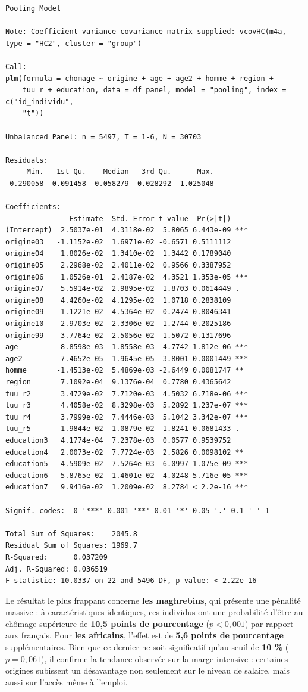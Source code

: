\documentclass[
  letterpaper,
  DIV=11,
  numbers=noendperiod]{scrartcl}
\begin{document}
\begin{verbatim}
Pooling Model

Note: Coefficient variance-covariance matrix supplied: vcovHC(m4a, type = "HC2", cluster = "group")

Call:
plm(formula = chomage ~ origine + age + age2 + homme + region + 
    tuu_r + education, data = df_panel, model = "pooling", index = c("id_individu", 
    "t"))

Unbalanced Panel: n = 5497, T = 1-6, N = 30703

Residuals:
     Min.   1st Qu.    Median   3rd Qu.      Max. 
-0.290058 -0.091458 -0.058279 -0.028292  1.025048 

Coefficients:
               Estimate  Std. Error t-value  Pr(>|t|)    
(Intercept)  2.5037e-01  4.3118e-02  5.8065 6.443e-09 ***
origine03   -1.1152e-02  1.6971e-02 -0.6571 0.5111112    
origine04    1.8026e-02  1.3410e-02  1.3442 0.1789040    
origine05    2.2968e-02  2.4011e-02  0.9566 0.3387952    
origine06    1.0526e-01  2.4187e-02  4.3521 1.353e-05 ***
origine07    5.5914e-02  2.9895e-02  1.8703 0.0614449 .  
origine08    4.4260e-02  4.1295e-02  1.0718 0.2838109    
origine09   -1.1221e-02  4.5364e-02 -0.2474 0.8046341    
origine10   -2.9703e-02  2.3306e-02 -1.2744 0.2025186    
origine99    3.7764e-02  2.5056e-02  1.5072 0.1317696    
age         -8.8598e-03  1.8558e-03 -4.7742 1.812e-06 ***
age2         7.4652e-05  1.9645e-05  3.8001 0.0001449 ***
homme       -1.4513e-02  5.4869e-03 -2.6449 0.0081747 ** 
region       7.1092e-04  9.1376e-04  0.7780 0.4365642    
tuu_r2       3.4729e-02  7.7120e-03  4.5032 6.718e-06 ***
tuu_r3       4.4058e-02  8.3298e-03  5.2892 1.237e-07 ***
tuu_r4       3.7999e-02  7.4446e-03  5.1042 3.342e-07 ***
tuu_r5       1.9844e-02  1.0879e-02  1.8241 0.0681433 .  
education3   4.1774e-04  7.2378e-03  0.0577 0.9539752    
education4   2.0073e-02  7.7724e-03  2.5826 0.0098102 ** 
education5   4.5909e-02  7.5264e-03  6.0997 1.075e-09 ***
education6   5.8765e-02  1.4601e-02  4.0248 5.716e-05 ***
education7   9.9416e-02  1.2009e-02  8.2784 < 2.2e-16 ***
---
Signif. codes:  0 '***' 0.001 '**' 0.01 '*' 0.05 '.' 0.1 ' ' 1

Total Sum of Squares:    2045.8
Residual Sum of Squares: 1969.7
R-Squared:      0.037209
Adj. R-Squared: 0.036519
F-statistic: 10.0337 on 22 and 5496 DF, p-value: < 2.22e-16
\end{verbatim}

Le résultat le plus frappant concerne \textbf{les maghrebins}, qui
présente une pénalité massive : à caractéristiques identiques, ces
individus ont une probabilité d'être au chômage supérieure de
\textbf{10,5 points de pourcentage} (\(p < 0,001\)) par rapport aux
français. Pour \textbf{les africains}, l'effet est de \textbf{5,6 points
de pourcentage} supplémentaires. Bien que ce dernier ne soit
significatif qu'au seuil de \textbf{10 \%} (\(p = 0,061\)), il confirme
la tendance observée sur la marge intensive : certaines origines
subissent un désavantage non seulement sur le niveau de salaire, mais
aussi sur l'accès même à l'emploi.
\end{document}
